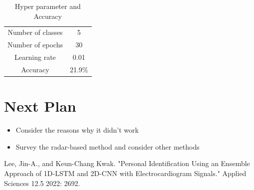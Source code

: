 \documentclass[dvipdfmx]{article}
\begin{document}
\begin{table}[H]
    \caption{Hyper parameter and Accuracy}
    \centering
    \begin{tabular}{cc}
    \hline
    Number of classes & 5 \\
    Number of epochs & 30 \\
    Learning rate & 0.01 \\
    Accuracy & 21.9\% \\
    \hline
    \end{tabular}
\end{table}


\section{Next Plan}
\begin{itemize}
    \item Consider the reasons why it didn't work
    \item Survey the radar-based method and consider other methods
\end{itemize}

\begin{thebibliography}{99}
     Lee, Jin-A., and Keun-Chang Kwak. "Personal Identification Using an Ensemble Approach of 1D-LSTM and 2D-CNN with Electrocardiogram Signals." Applied Sciences 12.5 2022: 2692.
\end{thebibliography}
\end{document}
